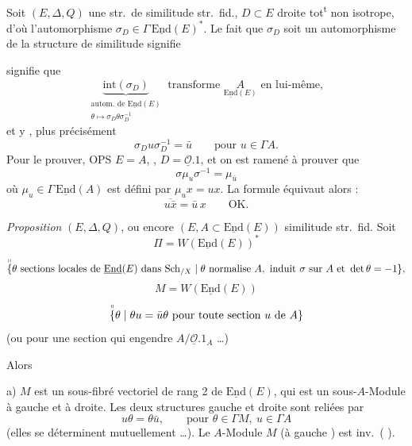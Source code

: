 \documentclass[11pt,a4paper]{article}
\begin{document}
Soit $(E, \Delta, Q)$ une str.\ de similitude str.\ fid., $D \subset E$ droite tot\textsuperscript{t} non isotrope, d'où l'automorphisme $\sigma_D \in \Gamma\, \underline{\mathrm{End}}(E)^{*}$. Le fait que $\sigma_D$ soit un automorphisme de la structure de similitude signifie

signifie que
\[
  \underbrace{\mathrm{int}(\sigma_D)}_{\substack{\text{autom.\ de } \underline{\mathrm{End}}(E)\\ \theta \mapsto \sigma_D \theta \sigma_D^{-1}}} \text{ transforme } \underset{\underline{\mathrm{End}}(E)}{\overset{}{A}} \text{ en lui-même},
\]
et y  , plus précisément
\[
  \boxed{\sigma_D u \sigma_D^{-1} = \bar{u}} \qquad \text{pour } u \in \Gamma A .
\]
Pour le prouver, OPS $E = A$, , $D = \underline{\mathcal{O}}.1$, et on est ramené à prouver que
\[
  \sigma \mu_u \sigma^{-1} = \mu_{\bar{u}}
\]
où $\mu_u \in \Gamma\, \underline{\mathrm{End}}(A)$ est défini par $\mu_u x = ux$. La formule équivaut alors :
\[
  \overline{u\bar{x}} = \bar{u}\, x \qquad \text{OK.}
\]

\emph{Proposition} $(E, \Delta, Q)$, ou encore $(E, A \subset \underline{\mathrm{End}}(E))$ similitude str.\ fid. Soit
\[
  \Pi = W(\underline{\mathrm{End}}(E))^{*}
\]
\[
  \overset{\shortparallel}{\{}\theta \text{ sections locales de } \underline{\mathrm{End}}(E) \text{ dans } \mathrm{Sch}_{/X} \mid \theta \text{ normalise } A, \text{ induit } \sigma \text{ sur } A \text{ et } \det\theta = -1\},
\]
  \struck{\ill{}}
\[
  M = W(\underline{\mathrm{End}}(E))
\]
\[
  \overset{\shortparallel}{\{}\theta \mid \theta u = \bar{u}\theta \text{ pour toute section } u \text{ de } A\}
\]
(ou pour une section qui engendre $A/\underline{\mathcal{O}}.1_A$ …)

Alors

a) $M$ est un sous-fibré vectoriel de rang 2 de $\underline{\mathrm{End}}(E)$, qui est un sous-$A$-Module à gauche et à droite. Les deux structures gauche et droite sont reliées par
\[
  u\theta = \theta\bar{u}, \qquad \text{pour } \theta \in \Gamma M,\ u \in \Gamma A
\]
(elles se déterminent  mutuellement …). Le $A$-Module $M$ (à gauche ) est  inv.\ ( \ill{}).
\end{document}
